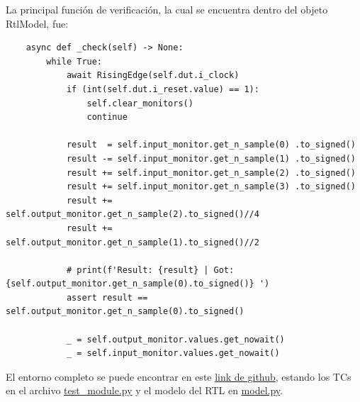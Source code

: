 La principal función de verificación, la cual se encuentra dentro del objeto RtlModel, fue:
\begin{verbatim}
    async def _check(self) -> None:
        while True:
            await RisingEdge(self.dut.i_clock)
            if (int(self.dut.i_reset.value) == 1):
                self.clear_monitors()
                continue

            result  = self.input_monitor.get_n_sample(0) .to_signed()
            result -= self.input_monitor.get_n_sample(1) .to_signed()
            result += self.input_monitor.get_n_sample(2) .to_signed()
            result += self.input_monitor.get_n_sample(3) .to_signed()
            result += self.output_monitor.get_n_sample(2).to_signed()//4
            result += self.output_monitor.get_n_sample(1).to_signed()//2

            # print(f'Result: {result} | Got: {self.output_monitor.get_n_sample(0).to_signed()} ')
            assert result == self.output_monitor.get_n_sample(0).to_signed()

            _ = self.output_monitor.values.get_nowait()
            _ = self.input_monitor.values.get_nowait()
\end{verbatim}

El entorno completo se puede encontrar en este \href{https://github.com/msebgarcia/DDA2024/tree/main/GP01/iir_filter/tb}{link de github}, estando los TCs en el archivo \href{https://github.com/msebgarcia/DDA2024/blob/main/GP01/iir_filter/tb/test_module.py}{test\_module.py} y el modelo del RTL en \href{https://github.com/msebgarcia/DDA2024/blob/main/GP01/iir_filter/tb/model.py}{model.py}.


